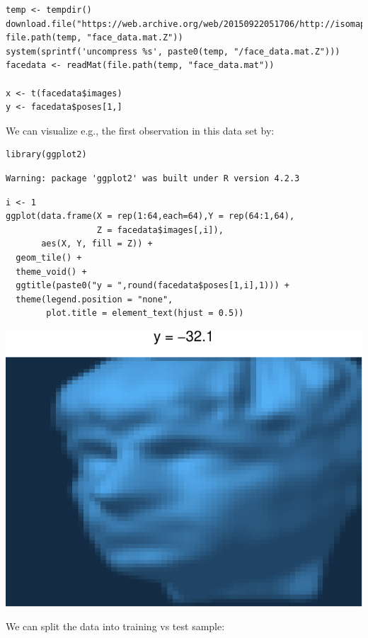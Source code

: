 \documentclass[
  article]{jss}
\begin{document}
\begin{verbatim}
temp <- tempdir()
download.file("https://web.archive.org/web/20150922051706/http://isomap.stanford.edu/face_data.mat.Z", file.path(temp, "face_data.mat.Z"))
system(sprintf('uncompress %s', paste0(temp, "/face_data.mat.Z")))
facedata <- readMat(file.path(temp, "face_data.mat"))

x <- t(facedata$images)
y <- facedata$poses[1,]
\end{verbatim}

We can visualize e.g., the first observation in this data set by:

\begin{verbatim}
library(ggplot2)
\end{verbatim}

\begin{verbatim}
Warning: package 'ggplot2' was built under R version 4.2.3
\end{verbatim}

\begin{verbatim}
i <- 1
ggplot(data.frame(X = rep(1:64,each=64),Y = rep(64:1,64),
                  Z = facedata$images[,i]),
       aes(X, Y, fill = Z)) +
  geom_tile() +
  theme_void() +
  ggtitle(paste0("y = ",round(facedata$poses[1,i],1))) +
  theme(legend.position = "none",
        plot.title = element_text(hjust = 0.5))
\end{verbatim}

\includegraphics{SPAR_files/figure-pdf/unnamed-chunk-4-1.pdf}

We can split the data into training vs test sample:
\end{document}
